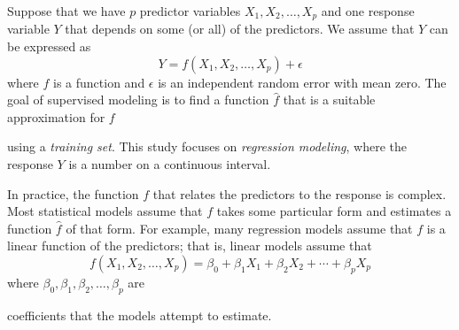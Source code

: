 \documentclass{article}
\begin{document}
	Suppose that we have $p$ predictor variables $X_1, X_2, \dotsc, X_p$ and one response variable $Y$ that depends on some (or all) of the predictors. We assume that $Y$ can be expressed as
	\begin{equation}\label{eqn:relationship}
		Y = f(X_1, X_2, \dotsc, X_p) + \epsilon
	\end{equation}
	where $f$ is a function and $\epsilon$ is an independent random error with mean zero. The goal of supervised modeling is to find a function $\hat{f}$ that is a suitable approximation for $f$ 

	using a \textit{training set}. This study focuses on \textit{regression modeling}, where the response $Y$ is a number on a continuous interval.
	

	
	In practice, the function $f$ that relates the predictors to the response is complex. Most statistical models assume that $f$ takes some particular form and estimates a function $\hat{f}$ of that form. For example, many regression models assume that $f$ is a linear function of the predictors; that is, linear models assume that
	\begin{equation}\label{eqn:linear-model}
		f(X_1, X_2, \dotsc, X_p) = \beta_0 + \beta_1 X_1 + \beta_2 X_2 + \cdots + \beta_p X_p
	\end{equation}
	where $\beta_0, \beta_1, \beta_2, \dotsc, \beta_p$ are 

	coefficients that the models attempt to estimate.
	
\end{document}
